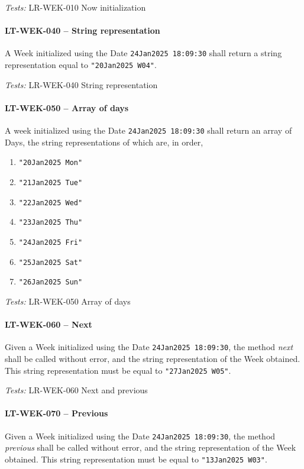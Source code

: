 \textit{Tests: } LR-WEK-010 Now initialization

\paragraph{LT-WEK-040 -- String representation}
A Week initialized using the Date \lstinline{24Jan2025 18:09:30} shall
return a string representation equal to \lstinline{"20Jan2025 W04"}.

\textit{Tests: } LR-WEK-040 String representation

\paragraph{LT-WEK-050 -- Array of days}
A week initialized using the Date \lstinline{24Jan2025 18:09:30} shall
return an array of Days, the string representations of which are,
in order,
\begin{enumerate}
\item \lstinline{"20Jan2025 Mon"}
\item \lstinline{"21Jan2025 Tue"}
\item \lstinline{"22Jan2025 Wed"}
\item \lstinline{"23Jan2025 Thu"}
\item \lstinline{"24Jan2025 Fri"}
\item \lstinline{"25Jan2025 Sat"}
\item \lstinline{"26Jan2025 Sun"}
\end{enumerate}

\textit{Tests: } LR-WEK-050 Array of days

\paragraph{LT-WEK-060 -- Next}
Given a Week initialized using the Date \lstinline{24Jan2025 18:09:30},
the method \emph{next} shall be called without error, and
the string representation of the Week obtained.
This string representation must be equal to \lstinline{"27Jan2025 W05"}.

\textit{Tests: } LR-WEK-060 Next and previous

\paragraph{LT-WEK-070 -- Previous}
Given a Week initialized using the Date \lstinline{24Jan2025 18:09:30},
the method \emph{previous} shall be called without error, and
the string representation of the Week obtained.
This string representation must be equal to \lstinline{"13Jan2025 W03"}.

